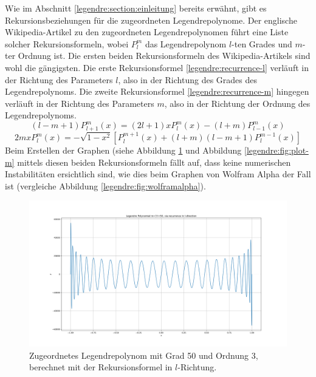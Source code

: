 Wie im Abschnitt \ref{legendre:section:einleitung} bereits erwähnt, gibt es Rekursionsbeziehungen für die zugeordneten Legendrepolynome.
Der englische Wikipedia-Artikel \cite{legendre:wikipedia} zu den zugeordneten Legendrepolynomen führt eine Liste solcher Rekursionsformeln, wobei $P^{m}_{l}$ das Legendrepolynom $l$-ten Grades und $m$-ter Ordnung ist.
Die ersten beiden Rekursionsformeln des Wikipedia-Artikels sind wohl die gängigsten.
Die erste Rekursionsformel \eqref{legendre:recurrence-l} verläuft in der Richtung des Parameters $l$, also in der Richtung des Grades des Legendrepolynoms.
Die zweite Rekursionsformel \eqref{legendre:recurrence-m} hingegen verläuft in der Richtung des Parameters $m$, also in der Richtung der Ordnung des Legendrepolynoms.
\begin{equation}
(l-m+1)P^{m}_{l+1}(x)
=(2l+1)xP^{m}_{l}(x)
-(l+m)P^{m}_{l-1}(x)
\label{legendre:recurrence-l}
\end{equation}
\begin{equation}
2mxP^{m}_{l}(x)
=-\sqrt{1-x^2}
\left[ P^{m+1}_{l}(x) + (l+m)(l-m+1)P^{m-1}_{l}(x) \right]
\label{legendre:recurrence-m}
\end{equation}
Beim Erstellen der Graphen (siehe Abbildung \ref{legendre:fig:plot-l} und Abbildung \ref{legendre:fig:plot-m} mittels diesen beiden Rekursionsformeln fällt auf, dass keine numerischen Instabilitäten ersichtlich sind, wie dies beim Graphen von Wolfram Alpha der Fall ist (vergleiche Abbildung \ref{legendre:fig:wolframalpha}).
\begin{figure}[!h]
\centering
\includegraphics[width=1.0\linewidth]{papers/legendre/plots/plot_l}
\caption{Zugeordnetes Legendrepolynom mit Grad 50 und Ordnung 3, berechnet mit der Rekursionsformel in \texorpdfstring{$l$}{l}-Richtung.}
\label{legendre:fig:plot-l}
\end{figure}
